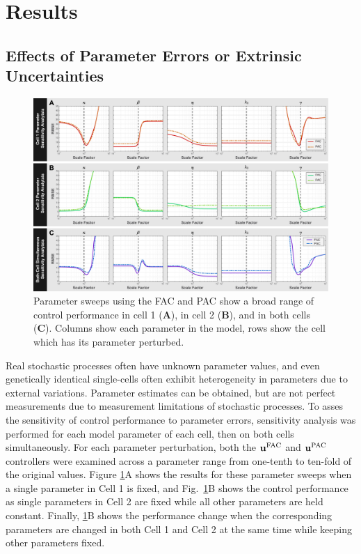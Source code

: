 \documentclass[12pt]{article}
\begin{document}
\section{Results}

\subsection{Effects of Parameter Errors or Extrinsic Uncertainties}
\begin{figure}
\begin{center}
\includegraphics[width=1\textwidth]{ParameterPerturbation.pdf}
\caption{Parameter sweeps using the FAC and PAC show a broad range of control performance in cell 1 ({\bf A}),  in cell 2 ({\bf B}), and in both cells ({\bf C}). Columns show each parameter in the model, rows show the cell which has its parameter perturbed. }
\label{Parameter}
\end{center}
\end{figure}


Real stochastic processes often have unknown parameter values, and even genetically identical single-cells often exhibit heterogeneity in parameters due to external variations. Parameter estimates can be obtained, but are not perfect measurements due to measurement limitations of stochastic processes.  To asses the sensitivity of control performance to parameter errors, sensitivity analysis was performed for each model parameter of each cell, then on both cells simultaneously. For each parameter perturbation, both the $\mathbf{u}^{\rm FAC}$ and $\mathbf{u}^{\rm PAC}$ controllers were examined across a parameter range from one-tenth to ten-fold of the original values.
 Figure \ref{Parameter}A shows the results for these parameter sweeps when a single parameter in Cell 1 is fixed, and Fig.\ \ref{Parameter}B shows the control performance as single parameters in Cell 2 are fixed while all other parameters are held constant.  Finally, \ref{Parameter}B  shows the performance change when the corresponding parameters are changed in both Cell 1 and Cell 2 at the same time while keeping other parameters fixed.
 
\end{document}
